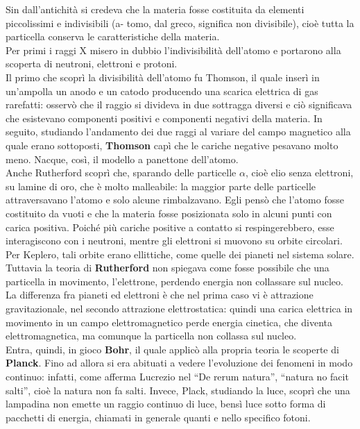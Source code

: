 Sin dall’antichità si credeva che la materia fosse costituita da elementi piccolissimi e indivisibili (a- tomo, dal greco, significa non divisibile), cioè tutta la particella conserva le caratteristiche della materia. \\
Per primi i raggi X misero in dubbio l’indivisibilità dell’atomo e portarono alla scoperta di neutroni, elettroni e protoni.\\
Il primo che scoprì la divisibilità dell’atomo fu Thomson, il quale inserì in un’ampolla un anodo e un
catodo producendo una scarica elettrica di gas rarefatti: osservò che il raggio si divideva in due sottragga diversi e ciò significava che esistevano componenti positivi e componenti negativi della materia. In seguito, studiando l’andamento dei due raggi al variare del campo magnetico alla quale erano sottoposti, \textbf{Thomson} capì che le cariche negative pesavano molto meno. Nacque, così, il modello a panettone dell’atomo.\\
Anche Rutherford scoprì che, sparando delle particelle $\alpha$, cioè elio senza elettroni, su lamine di oro, che è molto malleabile: la maggior parte delle particelle attraversavano l’atomo e solo alcune rimbalzavano. Egli pensò che l’atomo fosse costituito da vuoti e che la materia fosse posizionata solo in alcuni punti con carica positiva. Poiché più cariche positive a contatto si respingerebbero, esse interagiscono con i neutroni, mentre gli elettroni si muovono su orbite circolari.
Per Keplero, tali orbite erano ellittiche, come quelle dei pianeti nel sistema solare.\\
Tuttavia la teoria di \textbf{Rutherford} non spiegava come fosse possibile che una particella in movimento, l’elettrone, perdendo energia non collassare sul nucleo. La differenza fra pianeti ed elettroni è che nel prima caso vi è attrazione gravitazionale, nel secondo attrazione elettrostatica: quindi una carica elettrica in movimento in un campo elettromagnetico perde energia cinetica, che diventa elettromagnetica, ma comunque la particella non collassa sul nucleo.\\
Entra, quindi, in gioco \textbf{Bohr}, il quale applicò alla propria teoria le scoperte di \textbf{Planck}. Fino ad allora si era abituati a vedere l’evoluzione dei fenomeni in modo continuo: infatti, come afferma Lucrezio nel “De rerum natura”, “natura no facit salti”, cioè la natura non fa salti. Invece, Plack, studiando la luce, scoprì che una lampadina non emette un raggio continuo di luce, bensì luce sotto forma di pacchetti di energia, chiamati in generale quanti e nello specifico fotoni.\\
